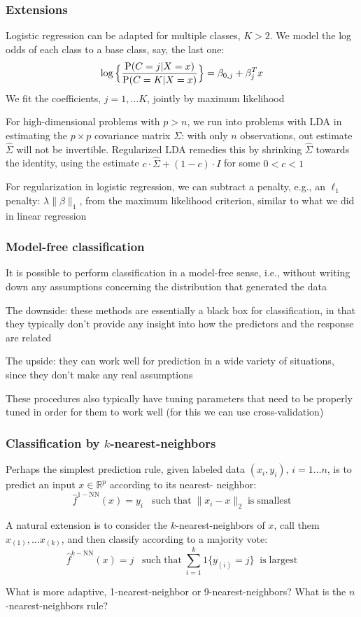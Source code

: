 \documentclass[mathserif]{beamer}
\def\P{\mathrm{P}}
\def\R{\mathds{R}}
\def\red{\color[rgb]{0.8,0,0}}
\begin{document}
\begin{frame}
\frametitle{Extensions}
Logistic regression can be adapted for {\red multiple classes}, $K>2$. We model
the log odds of each class to a base class, say, the last one:
\vspace{-1pt}
$$\log\Big\{\frac{\P(C=j|X=x)}{\P(C=K|X=x)}\Big\}
= \beta_{0,j}+\beta_j^T x
\vspace{-1pt}$$
We fit the coefficients, $j=1,\ldots K$, jointly by maximum likelihood

\bigskip
For {\red high-dimensional problems} with $p>n$, we run into problems with LDA
in estimating the $p \times p$ covariance matrix $\Sigma$: with only $n$ observations, out 
estimate $\hat{\Sigma}$ will not be invertible. {\red Regularized LDA} remedies this by 
shrinking $\hat{\Sigma}$ towards the identity, using the estimate
$c\cdot\hat{\Sigma} + (1-c)\cdot I$ for some $0<c<1$

\bigskip
For regularization in logistic regression, we can subtract a {\red penalty}, e.g., 
an $\ell_1$ penalty: $\lambda \|\beta\|_1$,
from the maximum likelihood criterion, similar to what we
did in linear regression
\end{frame}

\begin{frame}
\frametitle{Model-free classification}
It is possible to perform classification in a {\red model-free} sense, i.e.,
without writing down any assumptions concerning the distribution that generated the data

\bigskip
The downside: these methods are essentially a {\red black box} for classification, in
that they typically don't provide any insight into how the predictors and the response
are related

\bigskip
The upside: they can work well for prediction in a wide variety of situations, since they
don't make any real assumptions

\bigskip
These procedures also typically have {\red tuning parameters} that need to be properly
tuned in order for them to work well (for this we can use cross-validation)
\end{frame}

\begin{frame}
\frametitle{Classification by $k$-nearest-neighbors}
Perhaps the simplest prediction rule, given labeled data $(x_i,y_i)$, $i=1\ldots n$, 
is to predict an input $x \in \R^p$ according to its {\red nearest- neighbor}:
$$\hat{f}^{1-\mathrm{NN}}(x) = y_i \;\;\; \mathrm{such}\;\mathrm{that} \;\|x_i-x\|_2
\;\mathrm{is}\;\mathrm{smallest}$$

\smallskip
A natural extension is to consider the {\red $k$-nearest-neighbors} of $x$, call
them $x_{(1)},\ldots x_{(k)}$, and then classify according to a majority vote:
$$\hat{f}^{k-\mathrm{NN}}(x) = j \;\;\; \mathrm{such}\;\mathrm{that} \;
\sum_{i=1}^k 1\{y_{(i)}=j\} \;\;\mathrm{is}\;\mathrm{largest}$$

\smallskip
What is more adaptive, 1-nearest-neighbor or 9-nearest-neighbors? What is the
$n$-nearest-neighbors rule?
\end{frame}
\end{document}
